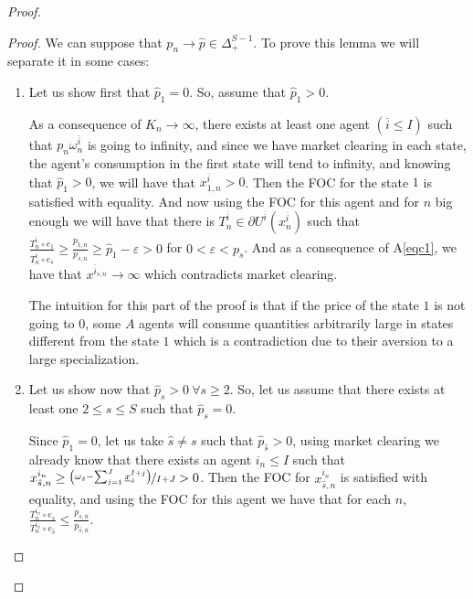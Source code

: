 \documentclass[pdftex]{article}
\numberwithin{equation}{section}
\theoremstyle{th}
\newtheorem{proof lemma}{{Proof Lemma}.}
\theoremstyle{definition}
\newtheorem*{risk lovers}{Risk lovers}
\newtheorem*{risk averse}{Risk averse}
\begin{document}
{\begin{proof}
\begin{proof}
We can suppose that $p_n\rightarrow\hat{p}\in\Delta_{+}^{S-1}$. To prove this lemma we will separate it in some cases:
\begin{enumerate}
\item Let us show first that $\hat{p}_1=0$. So, assume that $\hat{p}_1>0$.

As a consequence of $K_n\rightarrow\infty$, there exists at least one agent $\left(\overline{i}\leq{I}\right)$ such that $p_n\omega^{\overline{i}}_n$ is going to infinity, and since we have market clearing in each state, the agent's consumption in the first state will tend to infinity, and knowing that $\hat{p}_1>0$, we will have that $x_{1,n}^{\overline{i}}>0$. Then the FOC for the state $1$ is satisfied with equality. And now using the FOC for this agent and for $n$ big enough we will have that there is $T_n^{\overline{i}}\in\partial{U}^{\overline{i}}\left(x_n^{\overline{i}}\right)$ such that $\frac{T_n^{\overline{i}}\circ{e_1}}{T_n^{\overline{i}}\circ{e_s}}\geq\frac{p_{1,n}}{p_{s,n}}\geq{\hat{p}_1-\varepsilon}>0$ for $0<\varepsilon<p_s$. And as a consequence of A\ref{eqc1}, we have that $x^{\overline{i}_{s,n}}\rightarrow\infty$ which contradicts market clearing.

The intuition for this part of the proof is that if the price of the state $1$ is not going to $0$, some $A$ agents will consume quantities arbitrarily large in states different from the state $1$ which is a contradiction due to their aversion to a large specialization.


\item Let us show now that $\hat{p}_s>0\ \forall{s\geq2}$. So, let us assume that there exists at least one $2\leq{s}\leq{S}$ such that $\hat{p}_s=0$.

 Since $\hat{p}_1=0$, let us take $\hat{s}\neq s$ such that $\hat{p}_{\hat{s}}>0$, using market clearing we already know that there exists an agent $i_n\leq{I}$ such that $x_{\hat{s},n}^{i_{n}}\geq\nicefrac{\left(\omega_{\hat{s}}-\sum_{j=1}^J\underline{x}_{\hat{s}}^{I+j}\right)}{I+J}>0$. Then the FOC for $x_{\hat{s},n}^{i_n}$ is satisfied with equality, and using the FOC for this agent we have that for each $n$,
$\frac{T_n^{{i_n}}\circ{e_{{s}}}}{T_n^{{i_n}}\circ{e_{\hat{s}}}}\leq\frac{p_{s,n}}{p_{\hat{s},n}}$.


\end{enumerate}
\end{proof}
\end{proof}}
\end{document}
